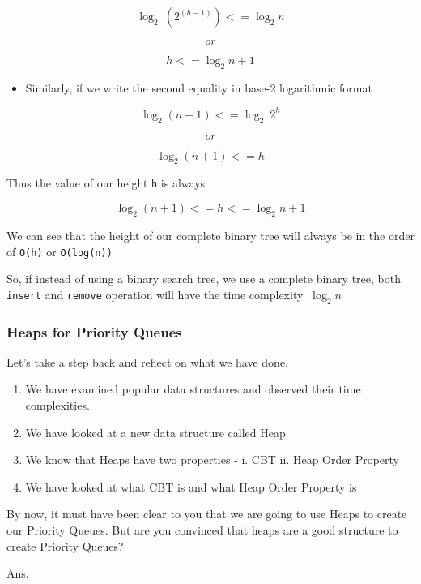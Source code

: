 \documentclass[11pt]{article}
\providecommand{\tightlist}{%
      \setlength{\itemsep}{0pt}\setlength{\parskip}{0pt}}
\begin{document}
\[ \log_{2}\ (2^{(h-1)}) <= \log_{2} n \]

\[or\]

\[ h <= \log_{2} n + 1\]

\begin{itemize}
\tightlist
\item
  Similarly, if we write the second equality in base-2 logarithmic
  format
\end{itemize}

\[ \log_{2} (n + 1) <= \log_{2}\ 2^{h}\]

\[ or \]

\[ \log_{2} (n + 1) <= h \]

Thus the value of our height \texttt{h} is always

\[ \log_{2} (n + 1) <= h <= \log_{2} n + 1\]

We can see that the height of our complete binary tree will always be in
the order of \texttt{O(h)} or \texttt{O(log(n))}

So, if instead of using a binary search tree, we use a complete binary
tree, both \texttt{insert} and \texttt{remove} operation will have the
time complexity \(\ \log_{2} n\)

    \subsubsection{Heaps for Priority
Queues}\label{heaps-for-priority-queues}

Let's take a step back and reflect on what we have done.

\begin{enumerate}
\def\labelenumi{\arabic{enumi}.}
\tightlist
\item
  We have examined popular data structures and observed their time
  complexities.
\item
  We have looked at a new data structure called Heap
\item
  We know that Heaps have two properties - i. CBT ii. Heap Order
  Property
\item
  We have looked at what CBT is and what Heap Order Property is
\end{enumerate}

By now, it must have been clear to you that we are going to use Heaps to
create our Priority Queues. But are you convinced that heaps are a good
structure to create Priority Queues?

Ans.
\end{document}
